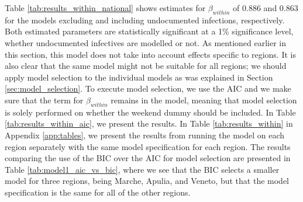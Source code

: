 \documentclass[12pt]{article}
\begin{document}
	Table \ref{tab:results_within_national} shows estimates for $\beta_{within}$ of 0.886 and 0.863 for the models excluding and including undocumented infections, respectively. Both estimated parameters are statistically significant at a 1\% significance level, whether undocumented infectives are modelled or not. As mentioned earlier in this section, this model does not take into account effects specific to regions. It is also clear that the same model might not be suitable for all regions; we should apply model selection to the individual models as was explained in Section \ref{sec:model_selection}. To execute model selection, we use the AIC and we make sure that the term for $\beta_{within}$ remains in the model, meaning that model selection is solely performed on whether the weekend dummy should be included. In Table \ref{tab:results_within_aic}, we present the results. In Table \ref{tab:results_within} in Appendix \ref{app:tables}, we present the results from running the model on each region separately with the same model specification for each region. The results comparing the use of the BIC over the AIC for model selection are presented in Table \ref{tab:model1_aic_vs_bic}, where we see that the BIC selects a smaller model for three regions, being Marche, Apulia, and Veneto, but that the model specification is the same for all of the other regions.
	
\end{document}
